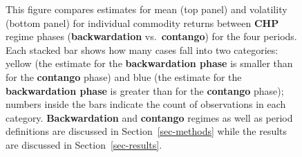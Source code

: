 \documentclass[
  authoryear,
  preprint,
  3p]{elsarticle}
\begin{document}
\newpage

\begin{figure}


\caption{\label{fig-regimes}This figure compares estimates for mean (top
panel) and volatility (bottom panel) for individual commodity returns
between \textbf{CHP} regime phases (\textbf{backwardation}
vs.~\textbf{contango}) for the four periods. Each stacked bar shows how
many cases fall into two categories: yellow (the estimate for the
\textbf{backwardation phase} is smaller than for the \textbf{contango}
phase) and blue (the estimate for the \textbf{backwardation phase} is
greater than for the \textbf{contango} phase); numbers inside the bars
indicate the count of observations in each category.
\textbf{Backwardation} and \textbf{contango} regimes as well as period
definitions are discussed in Section~\ref{sec-methods} while the results
are discussed in Section~\ref{sec-results}.}

\end{figure}%
\end{document}
